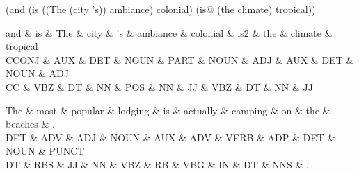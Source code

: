 (and (is ((The (city 's)) ambiance) colonial) (is{\arrwhich}@ (the climate) tropical))

\begin{dependency}
\begin{deptext}
and \& is \& The \& city \& 's \& ambiance \& colonial \& is{\arrwhich}2 \& the \& climate \& tropical \\
CCONJ \& AUX \& DET \& NOUN \& PART \& NOUN \& ADJ \& AUX \& DET \& NOUN \& ADJ \\
CC \& VBZ \& DT \& NN \& POS \& NN \& JJ \& VBZ \& DT \& NN \& JJ \\
\end{deptext}



\end{dependency}

\begin{dependency}
\begin{deptext}
The \& most \& popular \& lodging \& is \& actually \& camping \& on \& the \& beaches \& . \\
DET \& ADV \& ADJ \& NOUN \& AUX \& ADV \& VERB \& ADP \& DET \& NOUN \& PUNCT \\
DT \& RBS \& JJ \& NN \& VBZ \& RB \& VBG \& IN \& DT \& NNS \& . \\
\end{deptext}



\end{dependency}

